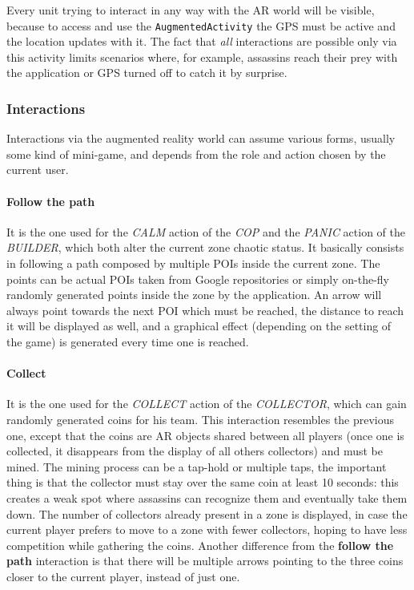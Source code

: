 			Every unit trying to interact in any way with the AR world will be visible, because to access and use the \lstinline|AugmentedActivity| the GPS must be active and the location updates with it.
			The fact that \emph{all} interactions are possible only via this activity limits scenarios where, for example, assassins reach their prey with the application or GPS turned off to catch it by surprise.
			
			\subsubsection{Interactions}\label{focus:augmented:actions}
			
			Interactions via the augmented reality world can assume various forms, usually some kind of mini-game, and depends from the role and action chosen by the current user.
			
				\paragraph{Follow the path}
				It is the one used for the \emph{CALM} action of the \emph{COP} and the \emph{PANIC} action of the \emph{BUILDER}, which both alter the current zone chaotic status.
				It basically consists in following a path composed by multiple POIs inside the current zone. The points can be actual POIs taken from Google repositories or simply on-the-fly randomly generated points inside the zone by the application.
				An arrow will always point towards the next POI which must be reached, the distance to reach it will be displayed as well, and a graphical effect (depending on the setting of the game) is generated every time one is reached.
				
				\paragraph{Collect}
				It is the one used for the \emph{COLLECT} action of the \emph{COLLECTOR}, which can gain randomly generated coins for his team.
				This interaction resembles the previous one, except that the coins are AR objects shared between all players (once one is collected, it disappears from the display of all others collectors) and must be mined. The mining process can be a tap-hold or multiple taps, the important thing is that the collector must stay over the same coin at least 10 seconds: this creates a weak spot where assassins can recognize them and eventually take them down. The number of collectors already present in a zone is displayed, in case the current player prefers to move to a zone with fewer collectors, hoping to have less competition while gathering the coins.
				Another difference from the \textbf{follow the path} interaction is that there will be multiple arrows pointing to the three coins closer to the current player, instead of just one.
				
